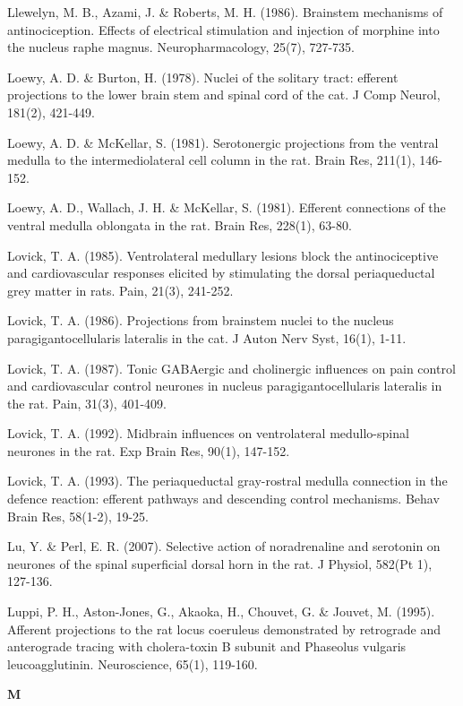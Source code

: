 \documentclass[a4paper,12pt,twoside]{report}
\begin{document}
\begin{singlespacing}
\begin{footnotesize}
Llewelyn, M. B., Azami, J. \& Roberts, M. H. (1986). Brainstem mechanisms of antinociception. Effects of electrical stimulation and injection of morphine into the nucleus raphe magnus. Neuropharmacology, 25(7), 727-735.

Loewy, A. D. \& Burton, H. (1978). Nuclei of the solitary tract: efferent projections to the lower brain stem and spinal cord of the cat. J Comp Neurol, 181(2), 421-449.

Loewy, A. D. \& McKellar, S. (1981). Serotonergic projections from the ventral medulla to the intermediolateral cell column in the rat. Brain Res, 211(1), 146-152.

Loewy, A. D., Wallach, J. H. \& McKellar, S. (1981). Efferent connections of the ventral medulla oblongata in the rat. Brain Res, 228(1), 63-80.

Lovick, T. A. (1985). Ventrolateral medullary lesions block the antinociceptive and cardiovascular responses elicited by stimulating the dorsal periaqueductal grey matter in rats. Pain, 21(3), 241-252.

Lovick, T. A. (1986). Projections from brainstem nuclei to the nucleus paragigantocellularis lateralis in the cat. J Auton Nerv Syst, 16(1), 1-11.

Lovick, T. A. (1987). Tonic GABAergic and cholinergic influences on pain control and cardiovascular control neurones in nucleus paragigantocellularis lateralis in the rat. Pain, 31(3), 401-409.

Lovick, T. A. (1992). Midbrain influences on ventrolateral medullo-spinal neurones in the rat. Exp Brain Res, 90(1), 147-152.

Lovick, T. A. (1993). The periaqueductal gray-rostral medulla connection in the defence reaction: efferent pathways and descending control mechanisms. Behav Brain Res, 58(1-2), 19-25.

Lu, Y. \& Perl, E. R. (2007). Selective action of noradrenaline and serotonin on neurones of the spinal superficial dorsal horn in the rat. J Physiol, 582(Pt 1), 127-136.

Luppi, P. H., Aston-Jones, G., Akaoka, H., Chouvet, G. \& Jouvet, M. (1995). Afferent projections to the rat locus coeruleus demonstrated by retrograde and anterograde tracing with cholera-toxin B subunit and Phaseolus vulgaris leucoagglutinin. Neuroscience, 65(1), 119-160.

\medskip
\begin{Large}\textbf{M}\end{Large}


\end{footnotesize}
\end{singlespacing}
\end{document}
